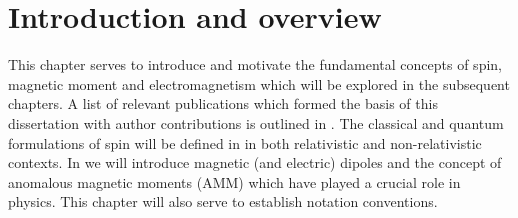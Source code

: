 \chapter{Introduction and overview}
\label{chap:intro}
\noindent This chapter serves to introduce and motivate the fundamental concepts of spin, magnetic moment and electromagnetism which will be explored in the subsequent chapters. A list of relevant publications which formed the basis of this dissertation with author contributions is outlined in . The classical and quantum formulations of spin will be defined in  in both relativistic and non-relativistic contexts. In  we will introduce magnetic (and electric) dipoles and the concept of anomalous magnetic moments (AMM) which have played a crucial role in physics. This chapter will also serve to establish notation conventions.


